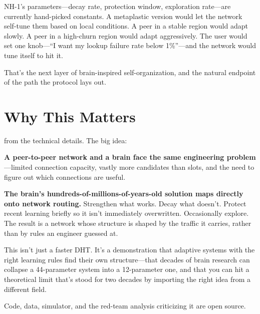\documentclass[nobib]{tufte-handout}
\begin{document}
NH-1's parameters---decay rate, protection window, exploration rate---are currently hand-picked constants. A metaplastic version would let the network self-tune them based on local conditions. A peer in a stable region would adapt slowly. A peer in a high-churn region would adapt aggressively. The user would set one knob---``I want my lookup failure rate below 1\%''---and the network would tune itself to hit it.

That's the next layer of brain-inspired self-organization, and the natural endpoint of the path the protocol lays out.

\section{Why This Matters}

 from the technical details. The big idea:

\textbf{A peer-to-peer network and a brain face the same engineering problem}---limited connection capacity, vastly more candidates than slots, and the need to figure out which connections are useful.

\textbf{The brain's hundreds-of-millions-of-years-old solution maps directly onto network routing.} Strengthen what works. Decay what doesn't. Protect recent learning briefly so it isn't immediately overwritten. Occasionally explore. The result is a network whose structure is shaped by the traffic it carries, rather than by rules an engineer guessed at.

This isn't just a faster DHT. It's a demonstration that adaptive systems with the right learning rules find their own structure---that decades of brain research can collapse a 44-parameter system into a 12-parameter one, and that you can hit a theoretical limit that's stood for two decades by importing the right idea from a different field.

Code, data, simulator, and the red-team analysis criticizing it are open source.
\end{document}
